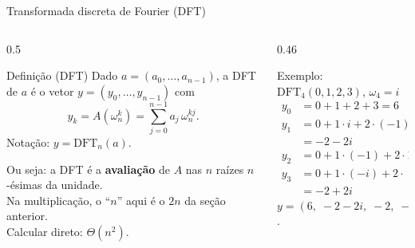 \documentclass[aspectratio=169,10pt]{beamer}
\newcommand{\w}[2][n]{\omega_{#1}^{#2}}       %
\newcommand{\DFT}{\mathrm{DFT}}
\begin{document}
\begin{frame}{Transformada discreta de Fourier (DFT)}
  \begin{columns}[T]
    \begin{column}{0.5\textwidth}
      \begin{block}{Definição (DFT)}
        Dado $a = (a_0,\dots,a_{n-1})$, a DFT de $a$ é o vetor
        $y = (y_0,\dots,y_{n-1})$ com
        \[
          y_k = A(\w{k}) = \sum_{j=0}^{n-1} a_j\, \w{kj}.
        \]
        Notação: $y = \DFT_n(a)$.
      \end{block}
      Ou seja: a DFT é a \textbf{avaliação} de $A$ nas $n$ raízes
      $n$-ésimas da unidade.\\[3pt]
      Na multiplicação, o ``$n$'' aqui é o $2n$ da seção anterior.\\[3pt]
      Calcular direto: \alert{$\Theta(n^2)$}.
    \end{column}
    \begin{column}{0.46\textwidth}
      \begin{exampleblock}{Exemplo: $\DFT_4(0,1,2,3)$, \; $\omega_4 = i$}
        \begin{align*}
          y_0 &= 0 + 1 + 2 + 3 = 6\\
          y_1 &= 0 + 1\cdot i + 2\cdot(-1) + 3\cdot(-i)\\
              &= -2 - 2i\\
          y_2 &= 0 + 1\cdot(-1) + 2\cdot 1 + 3\cdot(-1) = -2\\
          y_3 &= 0 + 1\cdot(-i) + 2\cdot(-1) + 3\cdot i\\
              &= -2 + 2i
        \end{align*}
        $y = (6,\; -2-2i,\; -2,\; -2+2i)$.
      \end{exampleblock}
    \end{column}
  \end{columns}
\end{frame}
\end{document}
